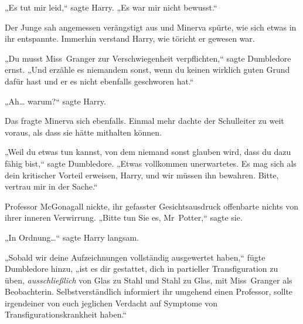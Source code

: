 „Es tut mir leid,“ sagte Harry. „Es war mir nicht bewusst.“

Der Junge sah angemessen verängstigt aus und Minerva spürte, wie sich etwas in ihr entspannte. Immerhin verstand Harry, wie töricht er gewesen war.

„Du musst Miss~Granger zur Verschwiegenheit verpflichten,“ sagte Dumbledore ernst. „Und erzähle es niemandem sonst, wenn du keinen wirklich guten Grund dafür hast und er es nicht ebenfalls geschworen hat.“

„Ah… warum?“ sagte Harry.

Das fragte Minerva sich ebenfalls. Einmal mehr dachte der Schulleiter zu weit voraus, als dass sie hätte mithalten können.

„Weil du etwas tun kannst, von dem niemand sonst glauben wird, dass du dazu fähig bist,“ sagte Dumbledore. „Etwas vollkommen unerwartetes. Es mag sich als dein kritischer Vorteil erweisen, Harry, und wir müssen ihn bewahren. Bitte, vertrau mir in der Sache.“

Professor McGonagall nickte, ihr gefasster Gesichtsausdruck offenbarte nichts von ihrer inneren Verwirrung. „Bitte tun Sie es, Mr~Potter,“ sagte sie.

„In Ordnung…“ sagte Harry langsam.

„Sobald wir deine Aufzeichnungen vollständig ausgewertet haben,“ fügte Dumbledore hinzu, „ist es dir gestattet, dich in partieller Transfiguration zu üben, \emph{ausschließlich} von Glas zu Stahl und Stahl zu Glas, mit Miss~Granger als Beobachterin. Selbstverständlich informiert ihr umgehend einen Professor, sollte irgendeiner von euch jeglichen Verdacht auf Symptome von Transfigurationskrankheit haben.“


